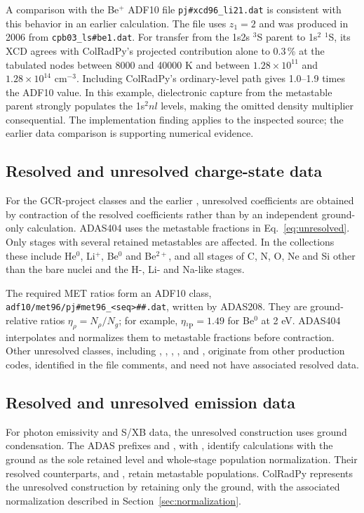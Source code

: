 \documentclass[11pt,a4paper]{article}
\newcommand{\code}[1]{\texttt{\detokenize{#1}}}
\numberwithin{equation}{section}
\begin{document}
A comparison with the Be$^+$ ADF10 file
\texttt{pj\#xcd96\_li21.dat} is consistent with this behavior in
an earlier calculation. The file uses $z_1=2$ and was produced in
2006 from \texttt{cpb03\_ls\#be1.dat}. For transfer from the
1s2s $^3$S parent to 1s$^2$ $^1$S, its XCD agrees with ColRadPy's
projected contribution alone to 0.3\,\% at the tabulated nodes
between 8000 and 40000 K and between $1.28\times10^{11}$ and
$1.28\times10^{14}$ cm$^{-3}$. Including ColRadPy's ordinary-level
path gives 1.0--1.9 times the ADF10 value. In this example,
dielectronic capture from the metastable parent strongly populates
the 1s$^2nl$ levels, making the omitted density multiplier
consequential. The implementation finding applies to the inspected
source; the earlier data comparison is supporting numerical evidence.

\subsection{Resolved and unresolved charge-state data}

For the GCR-project classes \code{96} and the earlier \code{93},
unresolved coefficients are obtained by contraction of the resolved
coefficients rather than by an independent ground-only calculation.
ADAS404 uses the metastable fractions in Eq.~\eqref{eq:unresolved}.
Only stages with several retained metastables are affected. In the
\code{96r} collections these include He$^0$, Li$^+$, Be$^0$ and
Be$^{2+}$, and all stages of C, N, O, Ne and Si other than the bare
nuclei and the H-, Li- and Na-like stages.

The required MET ratios form an ADF10 class,
\texttt{adf10/met96/pj\#met96\_<seq>\#\#.dat}, written by
ADAS208. They are ground-relative ratios
$\eta_\rho=N_\rho/N_g$; for example,
$\eta_{^3\mathrm P}=1.49$ for Be$^0$ at 2 eV. ADAS404
interpolates and normalizes them to metastable fractions before
contraction. Other unresolved classes, including \code{74},
\code{85}, \code{89}, \code{92}, \code{12} and \code{50},
originate from other production codes, identified in the file comments,
and need not have associated resolved data.

\subsection{Resolved and unresolved emission data}

For photon emissivity and S/XB data, the unresolved construction
uses ground condensation. The ADAS prefixes \code{pju} and
\code{llu}, with \code{INDM = T}, identify calculations with
the ground as the sole retained level and whole-stage population
normalization. Their resolved counterparts, \code{pjr} and
\code{llr}, retain metastable populations. ColRadPy represents
the unresolved construction by retaining only the ground, with
the associated normalization described in
Section~\ref{sec:normalization}.
\end{document}
